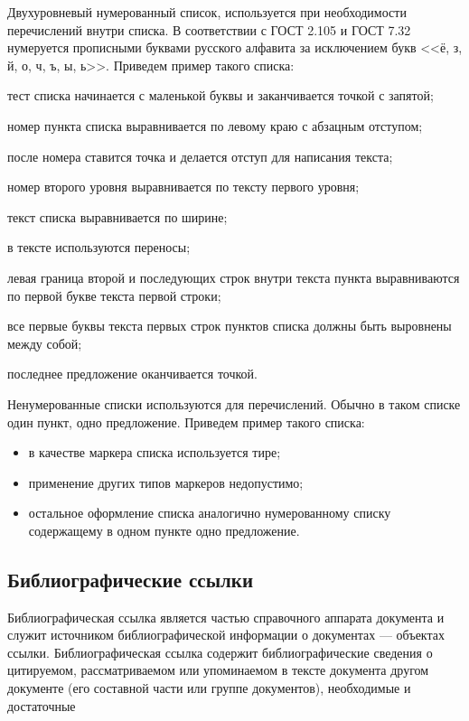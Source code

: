 \documentclass[12pt,a4paper, oneside]{extreport}
\begin{document}
Двухуровневый нумерованный список, используется при необходимости перечислений внутри списка. В соответствии с ГОСТ 2.105 и ГОСТ 7.32 нумеруется прописными буквами русского алфавита за исключением букв <<ё, з, й, о, ч, ъ, ы, ь>>. Приведем пример такого списка:
	\begin{twoenumerate}
		\item тест списка начинается с маленькой буквы и заканчивается точкой с запятой;
		\item номер пункта списка выравнивается по левому краю с абзацным отступом;
		\item после номера ставится точка и делается отступ для написания текста;
		\item номер второго уровня выравнивается по тексту первого уровня;
			\begin{twoenumerate}
				\item текст списка выравнивается по ширине; 
				\item в тексте используются переносы; 
				\item левая граница второй и последующих строк внутри текста пункта выравниваются по первой букве текста первой строки;
			\end{twoenumerate}
		\item все первые буквы текста первых строк пунктов списка должны быть выровнены между собой;
		\item последнее предложение оканчивается точкой.		
	\end{twoenumerate}

Ненумерованные списки используются для перечислений. Обычно в таком списке один пункт, одно предложение. Приведем пример такого списка:
\begin{itemize}
	\item в качестве маркера списка используется тире;
	\item применение других типов маркеров недопустимо; 
	\item остальное оформление списка аналогично нумерованному списку содержащему в одном пункте одно предложение.
\end{itemize}


\subsection{Библиографические ссылки}


 Библиографическая ссылка является частью справочного аппарата документа и служит источником библиографической информации о документах --- объектах ссылки. Библиографическая ссылка содержит библиографические сведения о цитируемом, рассматриваемом или упоминаемом в тексте документа другом документе (его составной части или группе документов), необходимые и достаточные 
\end{document}
